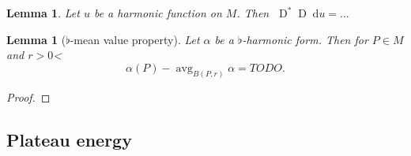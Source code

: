 \documentclass[reqno,12pt,letterpaper]{amsart}
\newcommand{\Hyp}{\mathbf H}
\DeclareMathOperator{\avg}{avg}
\newcommand*\dif{\mathop{}\!\mathrm{d}}
\newcommand*\Dif{\mathop{}\!\mathrm{D}}
\newtheorem{lemma}[theorem]{Lemma}
\theoremstyle{definition}
\numberwithin{equation}{section}
\begin{document}
\begin{lemma}
Let $u$ be a harmonic function on $M$. Then $\Dif^* \Dif \dif u = ...$
\end{lemma}

\begin{lemma}[$\flat$-mean value property]
Let $\alpha$ be a $\flat$-harmonic form. Then for $P \in M$ and $r > 0$<
$$\alpha(P) - \avg_{B(P, r)} \alpha = TODO.$$
\end{lemma}
\begin{proof}

\end{proof}

\subsection{Plateau energy}


\end{document}
